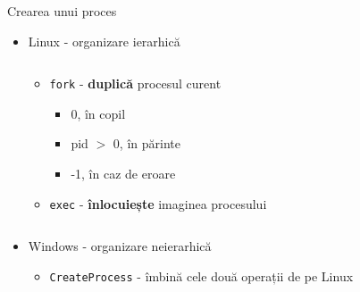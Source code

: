 \documentclass{so.cs.pub.ro}
\begin{document}
\begin{frame}{Crearea unui proces}

	\begin{itemize}
		\item Linux - organizare ierarhică
		\begin{columns}
			\begin{column}[1]{0.45\textwidth}
				\begin{itemize}
					\item \texttt{fork} - \textbf{duplică} procesul curent
					\begin{itemize}
						\item 0, în copil
						\item pid $>$ 0, în părinte
						\item -1, în caz de eroare		
					\end{itemize}
					\item \texttt{exec} - \textbf{înlocuiește} imaginea procesului		
				\end{itemize}
			\end{column}
			\begin{column}[1]{0.5\textwidth}
			\end{column}
		\end{columns}
		\vspace*{0.2cm}
		\item Windows - organizare neierarhică
		\begin{itemize}
			\item \texttt{CreateProcess} - îmbină cele două operații de pe Linux
		\end{itemize}
		
	\end{itemize}
	
\end{frame}
\end{document}
